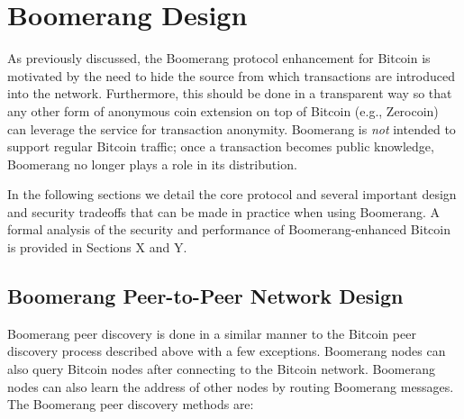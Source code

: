 \section{Boomerang Design} \label{sec:design}

As previously discussed, the Boomerang protocol enhancement for Bitcoin is motivated by the need to hide the source from which transactions are introduced into the network. Furthermore, this should be done in a transparent way so that any other form of anonymous coin extension on top of Bitcoin (e.g., Zerocoin) can leverage the service for transaction anonymity. Boomerang is \emph{not} intended to support regular Bitcoin traffic; once a transaction becomes public knowledge, Boomerang no longer plays a role in its distribution. 

In the following sections we detail the core protocol and several important design and security tradeoffs that can be made in practice when using Boomerang. A formal analysis of the security and performance of Boomerang-enhanced Bitcoin is provided in Sections X and Y. 

\subsection{Boomerang Peer-to-Peer Network Design}
Boomerang peer discovery is done in a similar manner to the Bitcoin peer discovery process described above with a few exceptions. Boomerang nodes can also query Bitcoin nodes after connecting to the Bitcoin network. Boomerang nodes can also learn the address of other nodes by routing Boomerang messages. The Boomerang peer discovery methods are:

